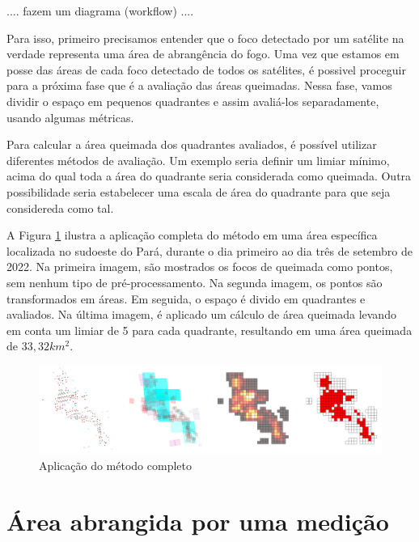 \documentclass[cic,tc]{iiufrgs}
\begin{document}
.... fazem um diagrama (workflow) .... \par

Para isso, primeiro precisamos entender que o foco detectado por um satélite na verdade representa uma área de abrangência do fogo. Uma vez que estamos em posse das áreas de cada foco detectado de todos os satélites, é possivel proceguir para a próxima fase que é a avaliação das áreas queimadas. Nessa fase, vamos dividir o espaço em pequenos quadrantes e assim avaliá-los separadamente, usando algumas métricas. \par

Para calcular a área queimada dos quadrantes avaliados, é possível utilizar diferentes métodos de avaliação. Um exemplo seria definir um limiar mínimo, acima do qual toda a área do quadrante seria considerada como queimada. Outra possibilidade seria estabelecer uma escala de área do quadrante para que seja considereda como tal. \par

A Figura \ref{fig:exemplo_metodo_completo} ilustra a aplicação completa do método em uma área específica localizada no sudoeste do Pará, durante o dia primeiro ao dia três de setembro de 2022. Na primeira imagem, são mostrados os focos de queimada como pontos, sem nenhum tipo de pré-processamento. Na segunda imagem, os pontos são transformados em áreas. Em seguida, o espaço é divido em quadrantes e avaliados. Na última imagem, é aplicado um cálculo de área queimada levando em conta um limiar de 5 para cada quadrante, resultando em uma área queimada de $33,32 km^2$. \par

\begin{figure}[H]
    \caption{Aplicação do método completo}
    \begin{center}
        \includegraphics[width=35em]{exemplo_metodo_completo}
    \end{center}
    \label{fig:exemplo_metodo_completo}
\end{figure}

\section{Área abrangida por uma medição}
\end{document}
